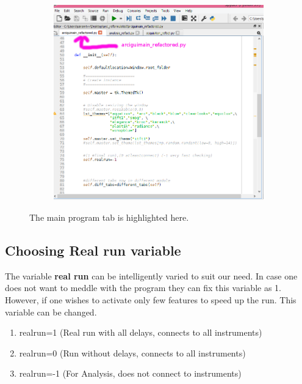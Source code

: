 \documentclass[12pt]{article}
\begin{document}
 \begin{figure}[H]
 
    \begin{subfigure}{1\textwidth}
    \includegraphics[scale=0.5]{images/arciguimain-refactored.png} 
    \label{fig:DJp1}
    \end{subfigure}
 \caption{The main program tab is highlighted here.}
\label{fig6}
\end{figure}
 
 
\subsection{Choosing Real run variable}
The variable \textbf{real run} can be intelligently varied to suit our need. In case one does not want to meddle with the program they can fix this variable as 1. However, if one wishes to activate only few features to speed up the run. This variable can be changed. 
\begin{enumerate}
    \item realrun=1 (Real run with all delays, connects to all instruments)
    \item realrun=0 (Run without delays, connects to all instruments)
    \item realrun=-1 (For Analysis, does not connect to instruments)
\end{enumerate} 
  
\end{document}
